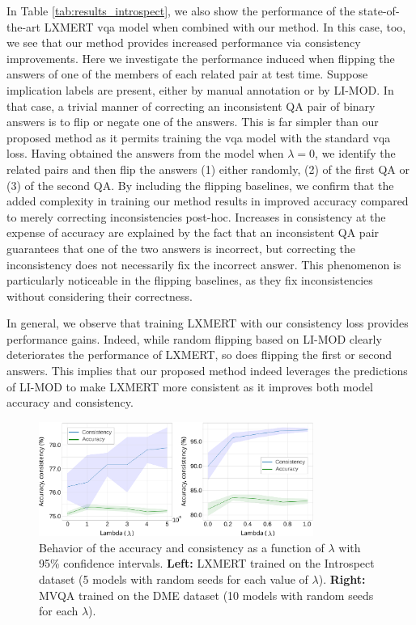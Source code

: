 In Table \ref{tab:results_introspect}, we also show the performance of the state-of-the-art LXMERT \gls{vqa} model when combined with our method. In this case, too, we see that our method provides increased performance via consistency improvements. Here we investigate the performance induced when flipping the answers of one of the members of each related pair at test time. Suppose implication labels are present, either by manual annotation or by LI-MOD. In that case, a trivial manner of correcting an inconsistent QA pair of binary answers is to flip or negate one of the answers. This is far simpler than our proposed method as it permits training the \gls{vqa} model with the standard \gls{vqa} loss. Having obtained the answers from the model when $\lambda=0$, we identify the related pairs and then flip the answers (1) either randomly, (2) of the first QA or (3) of the second QA. By including the flipping baselines, we confirm that the added complexity in training our method results in improved accuracy compared to merely correcting inconsistencies post-hoc. Increases in consistency at the expense of accuracy are explained by the fact that an inconsistent QA pair guarantees that one of the two answers is incorrect, but correcting the inconsistency does not necessarily fix the incorrect answer. This phenomenon is particularly noticeable in the flipping baselines, as they fix inconsistencies without considering their correctness.

In general, we observe that training LXMERT with our consistency loss provides performance gains. Indeed, while random flipping based on LI-MOD clearly deteriorates the performance of LXMERT, so does flipping the first or second answers. This implies that our proposed method indeed leverages the predictions of LI-MOD to make LXMERT more consistent as it improves both model accuracy and consistency. 
\begin{figure}[!t]
\centering
\includegraphics[width=0.8\textwidth]{Figures/Part2_Consist/02_logic/lambda_s.pdf}
\caption{Behavior of the accuracy and consistency as a function of $\lambda$ with 95\% confidence intervals. \textbf{Left:} LXMERT trained on the Introspect dataset (5 models with random seeds for each value of $\lambda$). \textbf{Right:} MVQA trained on the DME dataset (10 models with random seeds for each $\lambda$).}
\label{fig:lambda}
\end{figure}
